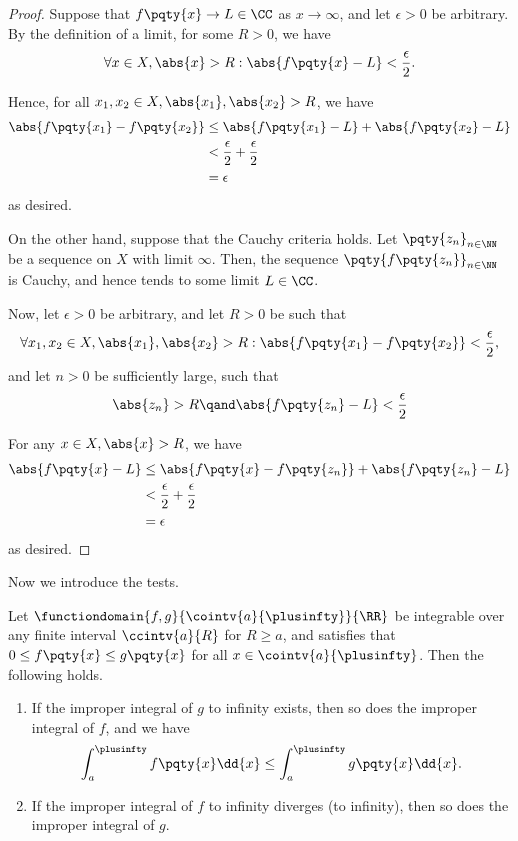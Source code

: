 \begin{proof}
    Suppose that \(f\pqty{x} \to L \in \CC\) as \(x \to \infty\), and let \(\epsilon > 0\) be arbitrary. By the definition of a limit, for some \(R > 0\), we have
    \[
        \forall x \in X, \abs{x} > R: \abs{f\pqty{x} - L} < \frac{\epsilon}{2}.
    \]

    Hence, for all \(x_1, x_2 \in X, \abs{x_1}, \abs{x_2} > R\), we have
    \begin{align*}
        \abs{f\pqty{x_1} - f\pqty{x_2}} &\leq \abs{f\pqty{x_1} - L} + \abs{f\pqty{x_2} - L} \\
        &< \frac{\epsilon}{2} + \frac{\epsilon}{2} \\
        &= \epsilon
    \end{align*}
    as desired.

    On the other hand, suppose that the Cauchy criteria holds. Let \(\pqty{z_n}_{n \in \NN}\) be a sequence on \(X\) with limit \(\infty\). Then, the sequence \(\pqty{f\pqty{z_n}}_{n \in \NN}\) is Cauchy, and hence tends to some limit \(L \in \CC\).

    Now, let \(\epsilon > 0\) be arbitrary, and let \(R > 0\) be such that
    \[
        \forall x_1, x_2 \in X, \abs{x_1}, \abs{x_2} > R: \abs{f\pqty{x_1} - f\pqty{x_2}} < \frac{\epsilon}{2},
    \]
    and let \(n > 0\) be sufficiently large, such that
    \[
        \abs{z_n} > R \qand \abs{f\pqty{z_n} - L} < \frac{\epsilon}{2}
    \]  

    For any \(x \in X, \abs{x} > R\), we have
    \begin{align*}
        \abs{f\pqty{x} - L} &\leq \abs{f\pqty{x} - f\pqty{z_n}} + \abs{f\pqty{z_n} - L} \\
        &< \frac{\epsilon}{2} + \frac{\epsilon}{2} \\
        &= \epsilon
    \end{align*}
    as desired.
\end{proof}

Now we introduce the tests.

\begin{proposition}
    \label{prop:int-test-comparison}%
    Let \(\functiondomain{f, g}{\cointv{a}{\plusinfty}}{\RR}\) be integrable over any finite interval \(\ccintv{a}{R}\) for \(R \geq a\), and satisfies that \(0 \leq f\pqty{x} \leq g\pqty{x}\) for all \(x \in \cointv{a}{\plusinfty}\). Then the following holds.

    \begin{enumerate}
        \item If the improper integral of \(g\) to infinity exists, then so does the improper integral of \(f\), and we have
        \[
            \int_{a}^{\plusinfty} f\pqty{x} \dd{x} \leq \int_{a}^{\plusinfty} g\pqty{x} \dd{x}.
        \]

        \item If the improper integral of \(f\) to infinity diverges (to infinity), then so does the improper integral of \(g\).
    \end{enumerate}
\end{proposition}

